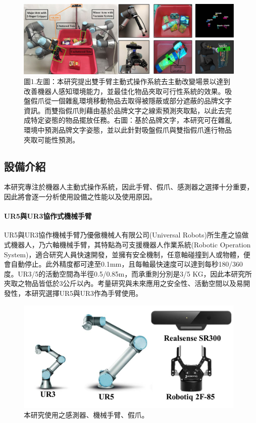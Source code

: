 \begin{figure}[ht]
	\centering
	\includegraphics[height=!, width=1.0\linewidth, keepaspectratio=true]
	{./figures/hardware_archi.jpg}
  \caption{圖1.左圖：本研究提出雙手臂主動式操作系統去主動改變場景以達到改善機器人感知環境能力，並最佳化物品夾取可行性系統的效果。吸盤假爪從一個雜亂環境移動物品去取得被隱蔽或部分遮蔽的品牌文字資訊。而雙指假爪則藉由基於品牌文字之線索預測夾取點，以此去完成特定姿態的物品擺放任務。右圖：基於品牌文字，本研究可在雜亂環境中預測品牌文字姿態，並以此針對吸盤假爪與雙指假爪進行物品夾取可能性預測。}
  \label{figure:hardware_archi}
\end{figure}


\subsection{設備介紹}
本研究專注於機器人主動式操作系統，因此手臂、假爪、感測器之選擇十分重要，因此將會逐一分析使用設備之性能以及使用原因。

\paragraph{UR5與UR3協作式機械手臂}
UR5與UR3協作機械手臂乃優傲機械人有限公司(Universal Robots)所生產之協做式機器人，乃六軸機械手臂，其特點為可支援機器人作業系統(Robotic Operation System)，適合研究人員快速開發，並擁有安全機制，任意軸碰撞到人或物體，便會自動停止。此外精度都可達至0.1mm，且每軸最快速度可以達到每秒180/360度。UR3/5的活動空間為半徑0.5/0.85m，而承重則分別是3/5 KG，因此本研究所夾取之物品皆低於3公斤以內。考量研究與未來應用之安全性、活動空間以及易開發性，本研究選擇UR5與UR3作為手臂使用。

\begin{figure}[ht]
	\centering
	\includegraphics[height=!, width=1.0\linewidth, keepaspectratio=true]
	{./figures/hardware_list.jpg}
  \caption{本研究使用之感測器、機械手臂、假爪。}
  \label{figure:hardware_list}
\end{figure}

